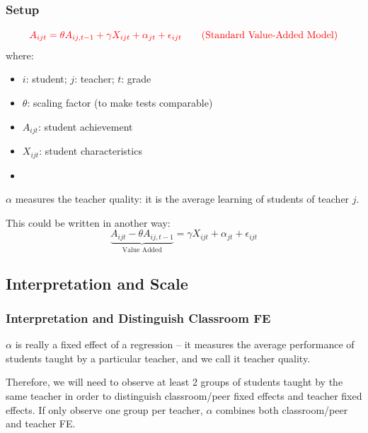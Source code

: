         \subsubsection{Setup}
            \begin{equation}
                \color{red}
                A_{ijt} = \theta A_{ij,t-1} + \gamma X_{ijt} + \alpha_{jt} + \epsilon_{ijt}
                \tag{Standard Value-Added Model}
                \label{eqn:edu_value_add_m}
            \end{equation}
            where:
            \begin{itemize}
                \item $i$: student; $j$: teacher; $t$: grade
                \item $\theta$: scaling factor (to make tests comparable)
                \item $A_{ijt}$: student achievement
                \item $X_{ijt}$: student characteristics
                \item {}
            \end{itemize}
            $\alpha$ measures the teacher quality: it is the average learning of students of teacher $j$.
            
            This could be written in another way:
            \begin{equation*}
                \underbrace{A_{ijt} - \theta A_{ij,t-1}}_{\text{Value Added}} = \gamma X_{ijt} + \alpha_{jt} + \epsilon_{ijt}
            \end{equation*}
        
    \subsection{Interpretation and Scale}
        
        \subsubsection{Interpretation and Distinguish Classroom FE}
            $\alpha$ is really a fixed effect of a regression -- it measures the average performance of students taught by a particular teacher, and we call it teacher quality.
            
            Therefore, we will need to observe at least 2 groups of students taught by the same teacher in order to distinguish classroom/peer fixed effects and teacher fixed effects. If only observe one group per teacher, $\alpha$ combines both classroom/peer and teacher FE.
        

